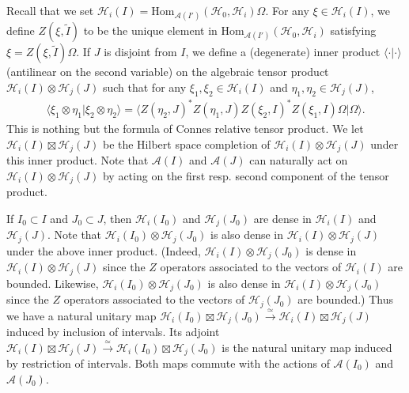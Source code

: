 \documentclass[12pt,a4paper]{article}
\theoremstyle{definition}
\theoremstyle{plain}
\newcommand{\mc}{\mathcal}
\newcommand{\wtd}{\widetilde}
\newcommand{\Hom}{\mathrm{Hom}}
\newcommand{\bk}[1]{\langle {#1}\rangle}
\numberwithin{equation}{section}
\begin{document}
Recall that we set $\mc H_i(I)=\Hom_{\mc A(I')}(\mc H_0,\mc H_i)\Omega$. For any $\xi\in\mc H_i(I)$, we define $Z(\xi,\wtd I)$ to be the unique element in $\Hom_{\mc A(I')}(\mc H_0,\mc H_i)$ satisfying $\xi=Z(\xi,\wtd I)\Omega$. If $J$ is disjoint from $I$, we define a (degenerate) inner product $\bk{\cdot|\cdot}$ (antilinear on the second variable) on the algebraic tensor product $\mc H_i(I)\otimes\mc H_j(J)$ such that for any $\xi_1,\xi_2\in\mc H_i(I)$ and $\eta_1,\eta_2\in\mc H_j(J)$,
\begin{align}
\bk{\xi_1\otimes\eta_1|\xi_2\otimes\eta_2}=\bk {Z(\eta_2,J)^*Z(\eta_1,J)Z(\xi_2,I)^*Z(\xi_1, I)\Omega|\Omega}.
\end{align}
This is nothing but the formula of Connes relative tensor product. We let $\mc H_i(I)\boxtimes\mc H_j(J)$ be the Hilbert space completion of $\mc H_i(I)\otimes\mc H_j(J)$ under this inner product. Note that $\mc A(I)$ and $\mc A(J)$ can naturally act on $\mc H_i(I)\otimes\mc H_j(J)$ by acting on the first resp. second component of the tensor product.

If $I_0\subset I$ and $J_0\subset J$, then $\mc H_i(I_0)$ and $\mc H_j(J_0)$ are dense in $\mc H_i(I)$ and $\mc H_j(J)$. Note that $\mc H_i(I_0)\otimes\mc H_j(J_0)$ is also dense in $\mc H_i(I)\otimes\mc H_j(J)$ under the above inner product. (Indeed, $\mc H_i(I)\otimes\mc H_j(J_0)$ is  dense in $\mc H_i(I)\otimes\mc H_j(J)$ since the $Z$ operators associated to the vectors of $\mc H_i(I)$ are bounded. Likewise, $\mc H_i(I_0)\otimes\mc H_j(J_0)$ is also dense in $\mc H_i(I)\otimes\mc H_j(J_0)$ since the $Z$ operators associated to the vectors of $\mc H_j(J_0)$ are bounded.) Thus we have  a natural unitary map $\mc H_i(I_0)\boxtimes\mc H_j(J_0)\xrightarrow{\simeq} \mc H_i(I)\boxtimes\mc H_j(J)$ induced by inclusion of intervals. Its adjoint $\mc H_i(I)\boxtimes\mc H_j(J)\xrightarrow{\simeq} \mc H_i(I_0)\boxtimes\mc H_j(J_0)$ is the natural unitary map induced by restriction of intervals. Both maps commute with the actions of $\mc A(I_0)$ and $\mc A(J_0)$.
\end{document}
